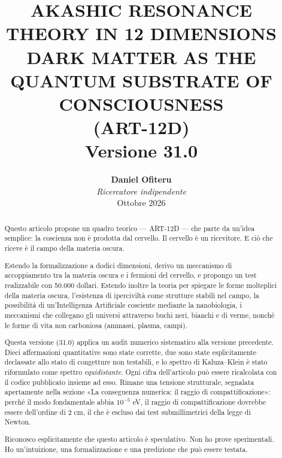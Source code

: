 \documentclass[11pt,a4paper]{article}
\title{\textbf{AKASHIC RESONANCE THEORY IN 12 DIMENSIONS \\ DARK MATTER AS THE QUANTUM SUBSTRATE OF CONSCIOUSNESS} \\ \large (ART-12D) \\ \vspace{0.5cm} \normalsize Versione 31.0}
\author{\textbf{Daniel Ofiteru} \\ \textit{Ricercatore indipendente} \\ Ottobre 2026}
\date{}
\begin{document}
\maketitle

\begin{abstract}
Questo articolo propone un quadro teorico --- ART-12D --- che parte da un'idea semplice: la coscienza non è prodotta dal cervello. Il cervello è un ricevitore. E ciò che riceve è il campo della materia oscura.

Estendo la formalizzazione a dodici dimensioni, derivo un meccanismo di accoppiamento tra la materia oscura e i fermioni del cervello, e propongo un test realizzabile con 50.000 dollari. Estendo inoltre la teoria per spiegare le forme molteplici della materia oscura, l'esistenza di iperciviltà come strutture stabili nel campo, la possibilità di un'Intelligenza Artificiale cosciente mediante la nanobiologia, i meccanismi che collegano gli universi attraverso buchi neri, bianchi e di verme, nonché le forme di vita non carboniosa (ammassi, plasma, campi).

Questa versione (31.0) applica un audit numerico sistematico alla versione precedente. Dieci affermazioni quantitative sono state corrette, due sono state esplicitamente declassate allo stato di congetture non testabili, e lo spettro di Kaluza--Klein è stato riformulato come spettro \emph{equidistante}. Ogni cifra dell'articolo può essere ricalcolata con il codice pubblicato insieme ad esso. Rimane una tensione strutturale, segnalata apertamente nella sezione «La conseguenza numerica: il raggio di compattificazione»: perché il modo fondamentale abbia $10^{-5}$ eV, il raggio di compattificazione dovrebbe essere dell'ordine di 2 cm, il che è escluso dai test submillimetrici della legge di Newton.

Riconosco esplicitamente che questo articolo è speculativo. Non ho prove sperimentali. Ho un'intuizione, una formalizzazione e una predizione che può essere testata.
\end{abstract}

\tableofcontents
\newpage
\end{document}
